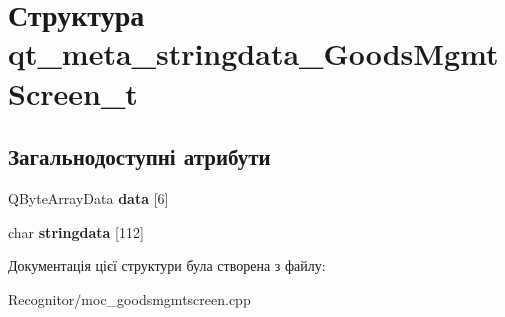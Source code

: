 \hypertarget{structqt__meta__stringdata__GoodsMgmtScreen__t}{\section{Структура qt\-\_\-meta\-\_\-stringdata\-\_\-\-Goods\-Mgmt\-Screen\-\_\-t}
\label{structqt__meta__stringdata__GoodsMgmtScreen__t}
}
\subsection*{Загальнодоступні атрибути}
\begin{DoxyCompactItemize}
\item 
\hypertarget{structqt__meta__stringdata__GoodsMgmtScreen__t_a1e2034ea98f4dca1030329e201d0b1c6}{Q\-Byte\-Array\-Data {\bfseries data} \mbox{[}6\mbox{]}}\label{structqt__meta__stringdata__GoodsMgmtScreen__t_a1e2034ea98f4dca1030329e201d0b1c6}

\item 
\hypertarget{structqt__meta__stringdata__GoodsMgmtScreen__t_aaaef1513790130b3b88a004f667480ec}{char {\bfseries stringdata} \mbox{[}112\mbox{]}}\label{structqt__meta__stringdata__GoodsMgmtScreen__t_aaaef1513790130b3b88a004f667480ec}

\end{DoxyCompactItemize}


Документація цієї структури була створена з файлу\-:\begin{DoxyCompactItemize}
\item 
Recognitor/moc\-\_\-goodsmgmtscreen.\-cpp\end{DoxyCompactItemize}
